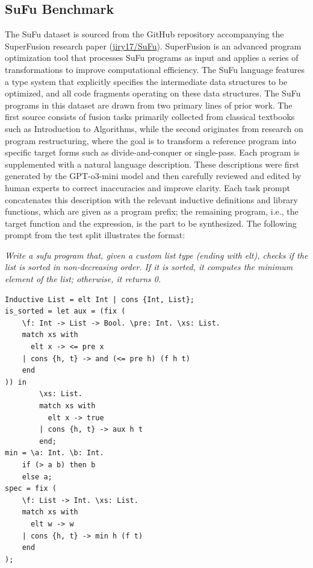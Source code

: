 \emergencystretch=0pt

\subsection{SuFu Benchmark}

The SuFu dataset is sourced from the GitHub repository accompanying the SuperFusion research paper (\href{https://github.com/jiry17/SuFu}{jiry17/SuFu}). SuperFusion is an advanced program optimization tool that processes SuFu programs as input and applies a series of transformations to improve computational efficiency. 
The SuFu language features a type system that explicitly specifies the intermediate data structures to be optimized, and all code fragments operating on these data structures.
The SuFu programs in this dataset are drawn from two primary lines of prior work. The first source consists of fusion tasks primarily collected from classical textbooks such as Introduction to Algorithms, while the second originates from research on program restructuring, where the goal is to transform a reference program into specific target forms such as divide-and-conquer or single-pass. 
Each program is supplemented with a natural language description. These descriptions were first generated by the GPT-o3-mini model and then carefully reviewed and edited by human experts to correct inaccuracies and improve clarity.
Each task prompt concatenates this description with the relevant inductive definitions and library functions, which are given as a program prefix; the remaining program, i.e., the target function and the  expression, is the part to be synthesized. The following prompt from the test split illustrates the format:

\begin{tcolorbox}[
    enhanced,
    breakable,
    colback=gray!5,
    colframe=black,
    boxrule=0.5pt,
    arc=2pt,
    left=8pt,
    right=8pt,
    top=8pt,
    bottom=8pt,
    title=Example SuFu Prompt
]
\textit{Write a sufu program that, given a custom list type (ending with elt), checks if the list is sorted in non-decreasing order. If it is sorted, it computes the minimum element of the list; otherwise, it returns 0.}
\begin{Verbatim}[fontsize=\small, xleftmargin=1em]
Inductive List = elt Int | cons {Int, List};
is_sorted = let aux = (fix (
    \f: Int -> List -> Bool. \pre: Int. \xs: List.
    match xs with
      elt x -> <= pre x
    | cons {h, t} -> and (<= pre h) (f h t)
    end
)) in
        \xs: List.
        match xs with
          elt x -> true
        | cons {h, t} -> aux h t
        end;
min = \a: Int. \b: Int.
    if (> a b) then b
    else a;
spec = fix (
    \f: List -> Int. \xs: List.
    match xs with
      elt w -> w
    | cons {h, t} -> min h (f t)
    end
);
\end{Verbatim}
\end{tcolorbox}

